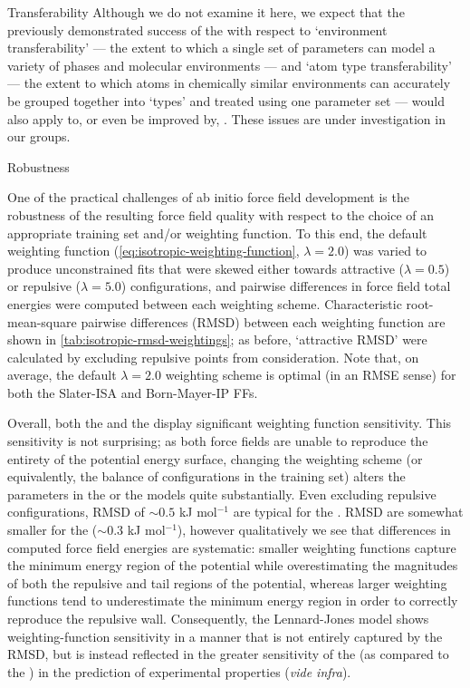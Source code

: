 \begin{subsection}{Transferability}
Although we do not examine it here, we expect that the previously demonstrated success\cite{McDaniel2013, McDaniel2012,
McDaniel2012a, McDaniel2014} of the \saptff with respect to `environment transferability'
--- the extent to which a single set of parameters can model a variety of phases and
molecular environments --- and `atom type transferability' --- the extent to which
atoms in chemically similar environments can accurately be grouped together
into `types' and treated using one parameter set --- 
would also apply to, or even be improved by, \isaffold. These issues are under
investigation in our groups.

\end{subsection}
\begin{subsection}{Robustness}
\label{sec:isotropic-results-robustness}


One of the practical challenges of ab initio force field development is the
robustness of the resulting force field quality with respect to the choice of an
appropriate training set and/or weighting function.  To this end, the default
weighting function (\cref{eq:isotropic-weighting-function}, $\lambda = 2.0$) was varied
to produce unconstrained fits that were skewed either towards attractive
($\lambda = 0.5$) or repulsive ($\lambda = 5.0$) configurations, and pairwise
differences in force field total energies were computed between each weighting
scheme. Characteristic root-mean-square pairwise differences (RMSD) between
each weighting function are shown in
\cref{tab:isotropic-rmsd-weightings}; as before, `attractive RMSD' were
calculated by excluding repulsive points from consideration. Note that, on
average, the default $\lambda = 2.0$ weighting scheme is optimal (in an RMSE
sense) for both the Slater-ISA and Born-Mayer-IP FFs.

Overall, both the \saptff and the \ljff display significant weighting function
sensitivity. This sensitivity is not surprising; as both force fields are
unable to reproduce the entirety of the potential energy surface, changing the
weighting scheme (or equivalently, the balance of configurations in the
training set) alters the parameters in the \saptff or the \ljff models quite 
substantially. Even excluding repulsive configurations, RMSD
of $\sim0.5$ kJ mol$^{-1}$ are typical for the \saptff. RMSD are
somewhat smaller for the \ljff ($\sim0.3$ kJ mol$^{-1}$), however
qualitatively we see that differences in computed force field energies are systematic: smaller weighting
functions capture the minimum energy region of the potential while
overestimating the magnitudes of both the repulsive and tail regions of the
potential, whereas larger weighting functions tend to underestimate the
minimum energy region in order to correctly reproduce the repulsive wall.
Consequently, the Lennard-Jones model shows weighting-function sensitivity in
a manner that is not entirely captured by the RMSD, but is instead
reflected in the greater sensitivity of the \ljff (as compared to the \saptff)
in the prediction of experimental properties (\emph{vide infra}).
 

\end{subsection}
